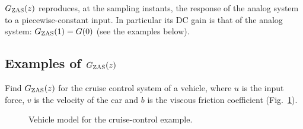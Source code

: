 \begin{remark}[added]
$G_{\mathrm{ZAS}}(z)$ reproduces, at the sampling instants, the response of the analog system to a piecewise-constant
input. In particular its DC gain is that of the analog system: $G_{\mathrm{ZAS}}(1)=G(0)$ (see the examples below).
\end{remark}

\subsection{Examples of $G_{\mathrm{ZAS}}(z)$}

\begin{example}
Find $G_{\mathrm{ZAS}}(z)$ for the cruise control system of a vehicle, where $u$ is the input force, $v$ is the
velocity of the car and $b$ is the viscous friction coefficient (Fig.~\ref{fig:cruise}).

\begin{figure}[H]
\centering
{}
\caption{Vehicle model for the cruise-control example.}\label{fig:cruise}
\end{figure}


\end{example}
